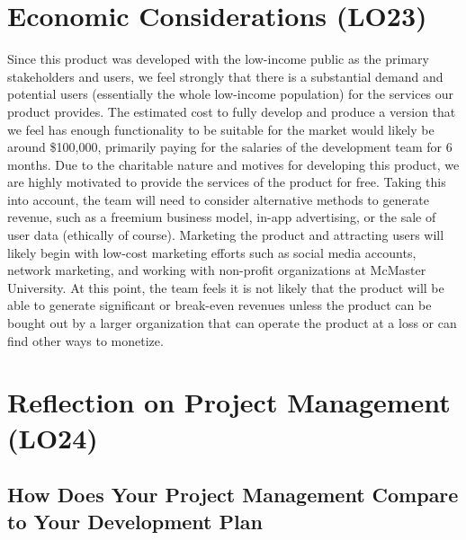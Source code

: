 \documentclass{article}
\begin{document}
\section{Economic Considerations (LO23)}

Since this product was developed with the low-income public as the primary stakeholders and users, we feel strongly that there is a substantial demand and potential users (essentially the whole low-income population) for the services our product provides. The estimated cost to fully develop and produce a version that we feel has enough functionality to be suitable for the market would likely be around \$100,000, primarily paying for the salaries of the development team for 6 months. Due to the charitable nature and motives for developing this product, we are highly motivated to provide the services of the product for free. Taking this into account, the team will need to consider alternative methods to generate revenue, such as a freemium business model, in-app advertising, or the sale of user data (ethically of course). Marketing the product and attracting users will likely begin with low-cost marketing efforts such as social media accounts, network marketing, and working with non-profit organizations at McMaster University. At this point, the team feels it is not likely that the product will be able to generate significant or break-even revenues unless the product can be bought out by a larger organization that can operate the product at a loss or can find other ways to monetize.

\section{Reflection on Project Management (LO24)}


\subsection{How Does Your Project Management Compare to Your Development Plan}
\end{document}
